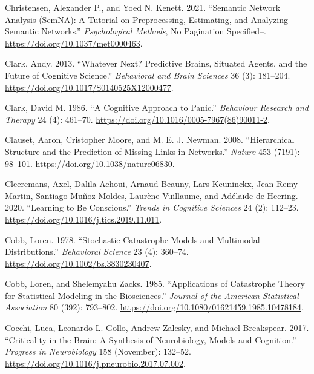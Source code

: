 \documentclass[
  a4paper,
  DIV=11,
  numbers=noendperiod]{scrreprt}
\newlength{\cslhangindent}
\newlength{\cslentryspacingunit} %
\newenvironment{CSLReferences}[2] %
 {%
  \setlength{\parindent}{0pt}
  \ifodd #1
  \let\oldpar\par
  \def\par{\hangindent=\cslhangindent\oldpar}
  \fi
  \setlength{\parskip}{#2\cslentryspacingunit}
 }%
 {}
\begin{document}
\begin{CSLReferences}{1}{0}
\leavevmode{}%
Christensen, Alexander P., and Yoed N. Kenett. 2021. {``Semantic Network
Analysis ({SemNA}): {A} Tutorial on Preprocessing, Estimating, and
Analyzing Semantic Networks.''} \emph{Psychological Methods}, No
Pagination Specified--. \url{https://doi.org/10.1037/met0000463}.

\leavevmode{}%
Clark, Andy. 2013. {``Whatever Next? {Predictive} Brains, Situated
Agents, and the Future of Cognitive Science.''} \emph{Behavioral and
Brain Sciences} 36 (3): 181--204.
\url{https://doi.org/10.1017/S0140525X12000477}.

\leavevmode{}%
Clark, David M. 1986. {``A Cognitive Approach to Panic.''}
\emph{Behaviour Research and Therapy} 24 (4): 461--70.
\url{https://doi.org/10.1016/0005-7967(86)90011-2}.

\leavevmode{}%
Clauset, Aaron, Cristopher Moore, and M. E. J. Newman. 2008.
{``Hierarchical Structure and the Prediction of Missing Links in
Networks.''} \emph{Nature} 453 (7191): 98--101.
\url{https://doi.org/10.1038/nature06830}.

\leavevmode{}%
Cleeremans, Axel, Dalila Achoui, Arnaud Beauny, Lars Keuninckx,
Jean-Remy Martin, Santiago Muñoz-Moldes, Laurène Vuillaume, and Adélaïde
de Heering. 2020. {``Learning to Be Conscious.''} \emph{Trends in
Cognitive Sciences} 24 (2): 112--23.
\url{https://doi.org/10.1016/j.tics.2019.11.011}.

\leavevmode{}%
Cobb, Loren. 1978. {``Stochastic Catastrophe Models and Multimodal
Distributions.''} \emph{Behavioral Science} 23 (4): 360--74.
\url{https://doi.org/10.1002/bs.3830230407}.

\leavevmode{}%
Cobb, Loren, and Shelemyahu Zacks. 1985. {``Applications of {Catastrophe
Theory} for {Statistical Modeling} in the {Biosciences}.''}
\emph{Journal of the American Statistical Association} 80 (392):
793--802. \url{https://doi.org/10.1080/01621459.1985.10478184}.

\leavevmode{}%
Cocchi, Luca, Leonardo L. Gollo, Andrew Zalesky, and Michael Breakspear.
2017. {``Criticality in the Brain: {A} Synthesis of Neurobiology, Models
and Cognition.''} \emph{Progress in Neurobiology} 158 (November):
132--52. \url{https://doi.org/10.1016/j.pneurobio.2017.07.002}.


\end{CSLReferences}
\end{document}
